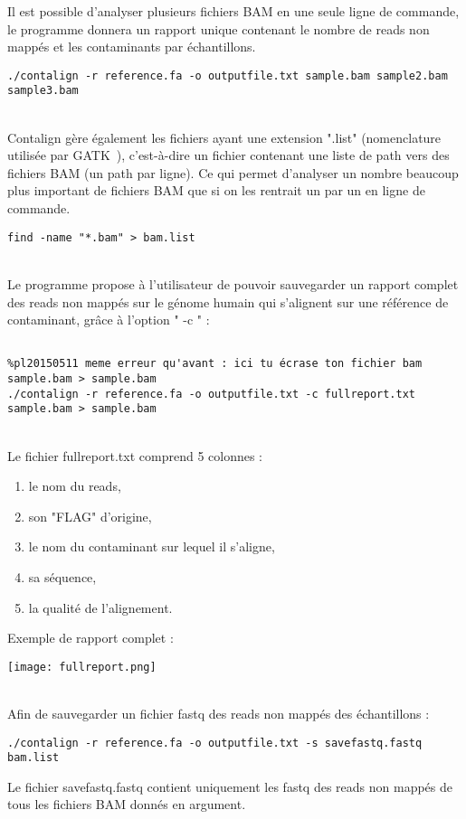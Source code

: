 \documentclass[a4paper,12pt]{article}
\begin{document}
Il est possible d'analyser plusieurs fichiers BAM en une seule ligne de commande, le programme donnera un rapport unique contenant le nombre de reads non mappés et les contaminants par échantillons. 
\begin{lstlisting}
./contalign -r reference.fa -o outputfile.txt sample.bam sample2.bam sample3.bam
\end{lstlisting} 
~\\
Contalign gère également les fichiers ayant une extension ".list" (nomenclature utilisée par GATK~\cite{gatk}), c'est-à-dire un fichier contenant une liste de path vers des fichiers BAM (un path par ligne). Ce qui permet d'analyser un nombre beaucoup plus important de fichiers BAM que si on les rentrait un par un en ligne de commande.
\begin{lstlisting}
find -name "*.bam" > bam.list
\end{lstlisting} 
~\\
Le programme propose à l'utilisateur de pouvoir sauvegarder un rapport complet des reads non mappés sur le génome humain qui s'alignent sur une référence de contaminant, grâce à l'option " -c " :
\begin{lstlisting}

%pl20150511 meme erreur qu'avant : ici tu écrase ton fichier bam sample.bam > sample.bam
./contalign -r reference.fa -o outputfile.txt -c fullreport.txt sample.bam > sample.bam\end{lstlisting}
~\\
Le fichier fullreport.txt comprend 5 colonnes :
\begin{enumerate}
\item le nom du reads,
\item son "FLAG" d'origine,
\item le nom du contaminant sur lequel il s'aligne, 
\item sa séquence,
\item la qualité de l'alignement.
\end{enumerate}
\clearpage
Exemple de rapport complet : 
\begin{center}
 \texttt{[image: fullreport.png]}
\end{center}
~\\
Afin de sauvegarder un fichier fastq des reads non mappés des échantillons : 
\begin{lstlisting}
./contalign -r reference.fa -o outputfile.txt -s savefastq.fastq bam.list \end{lstlisting}
Le fichier savefastq.fastq contient uniquement les fastq des reads non mappés de tous les fichiers BAM donnés en argument. \\
\end{document}
